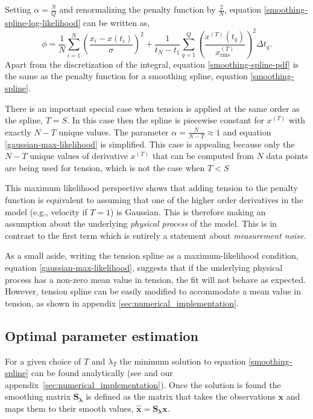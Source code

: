 \documentclass[10pt,journal]{IEEEtran}
\begin{document}
Setting $\alpha=\frac{N}{Q}$ and renormalizing the penalty function by $\frac{2}{N}$, equation \ref{smoothing-spline-log-likelihood} can be written as,
\begin{equation}
\label{smoothing-spline-pdf}
\phi = \frac{1}{N} \sum^N _{i=1}  \left( \frac{x_i - x(t_i)}{\sigma} \right)^2 + \frac{1}{t_N-t_1} \sum^{Q}_{q=1}  \left(  \frac{x^{(T)}(t_q)}{x^{(T)}_{\textrm{rms}}} \right)^2 \Delta t_q.
\end{equation}
Apart from the discretization of the integral, equation \ref{smoothing-spline-pdf} is the same as the penalty function for a smoothing spline, equation \ref{smoothing-spline}.

There is an important special case when tension is applied at the same order as the spline, $T=S$. In this case then the spline is piecewise constant for $x^{(T)}$ with exactly $N-T$ unique values. The parameter $\alpha =\frac{N}{N-T}\approx 1$ and equation \ref{gaussian-max-likelihood} is simplified. This case is appealing because only the $N-T$ unique values of derivative $x^{(T)}$ that can be computed from $N$ data points are being used for tension, which is not the case when $T<S$

This maximum likelihood perspective shows that adding tension to the penalty function is equivalent to assuming that one of the higher order derivatives in the model (e.g., velocity if $T=1$) is Gaussian. This is therefore making an assumption about the underlying \emph{physical process} of the model. This is in contrast to the first term which is entirely a statement about \emph{measurement noise}.

As a small aside, writing the tension spline as a maximum-likelihood condition, equation \ref{gaussian-max-likelihood}, suggests that if the underlying physical process has a non-zero mean value in tension, the fit will not behave as expected. However, tension spline can be easily modified to accommodate a mean value in tension, as shown in appendix \ref{sec:numerical_implementation}. 

\subsection{Optimal parameter estimation} \label{sec:optimal_parameter}

For a given choice of $T$ and $\lambda_T$ the minimum solution to equation \ref{smoothing-spline} can be found analytically (see \cite{teanby2007-mg} and our appendix~\ref{sec:numerical_implementation}). Once the solution is found the smoothing matrix $\mathbf{S_\lambda}$ is defined as the matrix that takes the observations $\mathbf{x}$ and maps them to their smooth values, $\mathbf{\hat{x}} = \mathbf{S_\lambda} \mathbf{x}$.
\end{document}

